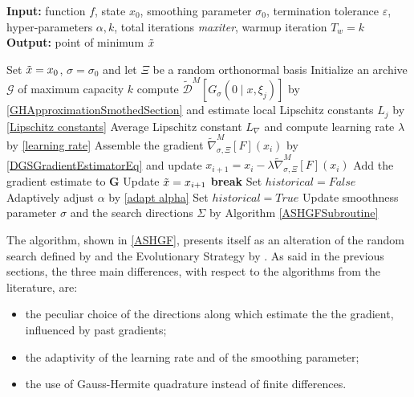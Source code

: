 \begin{algorithm}[!ht]
\caption{ASHGF algorithm}\label{ASHGF}

\hspace*{\algorithmicindent} \textbf{Input:} function $f$, state $x_0$, smoothing parameter $\sigma_0$, termination tolerance $\varepsilon$, hyper-parameters $\alpha, k$, total iterations \textit{maxiter}, warmup iteration $T_w = k$\\
\hspace*{\algorithmicindent} \textbf{Output:} point of minimum $\Tilde{x}$
\begin{algorithmic}[1]

\State Set $\Tilde{x} = x_0$, $\sigma = \sigma_0$ and let $\Xi$ be a random orthonormal basis
\State Initialize an archive $\mathcal{G}$ of maximum capacity $k$
        \State compute $ \widetilde{\mathcal{D}}^{M}\left[G_{\sigma}\left(0 \mid x, \xi_{j}\right)\right] $ by \ref{GHApproximationSmothedSection} and estimate local Lipschitz constants $L_j$ by \ref{Lipschitz constants}
    \EndFor
    \State Average Lipschitz constant $L_\nabla$ and compute learning rate $\lambda$ by \ref{learning rate}
    \State Assemble the gradient $ \widetilde{\nabla}_{\sigma, \Xi}^{M}[F](x_i) $ by \ref{DGSGradientEstimatorEq} and update $ x_{i+1}=x_{i}-\lambda \widetilde{\nabla}_{\sigma, \Xi}^{M}[F](x_i) $
    \State Add the gradient estimate to $\mathbf{G}$
        \State Update $\Tilde{x} = x_{i+1}$
    \EndIf
        \State \textbf{break}
    \Else
            \State Set $historical = False$
        \Else
                \State Adaptively adjust $\alpha$ by \ref{adapt alpha}
            \EndIf
            \State Set $historical = True$
        \EndIf
        \State Update smoothness parameter $\sigma$ and the search directions $\Sigma$ by Algorithm \ref{ASHGFSubroutine}
    \EndIf
\EndFor

\end{algorithmic}
\end{algorithm}

The algorithm, shown in \ref{ASHGF}, presents itself as an alteration of the random search defined by \cite{nesterov2017random} and the Evolutionary Strategy by \cite{Salimans2017}. As said in the previous sections, the three main differences, with respect to the algorithms from the literature, are:
\begin{itemize}
    \item the peculiar choice of the directions along which estimate the the gradient, influenced by past gradients;
    \item the adaptivity of the learning rate and of the smoothing parameter;
    \item the use of Gauss-Hermite quadrature instead of finite differences.
\end{itemize}

